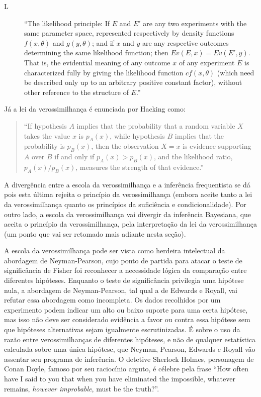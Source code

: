 \begin{description}
\item[L]
``The likelihood principle: If $E$ and $E\prime$ are any two experiments with the same parameter space,
 represented respectively by density functions $f(x, \theta)$ and $g(y, \theta)$; and if $x$ and $y$ are
 any respective outcomes determining the same likelihood function; then $Ev(E, x) = Ev(E\prime, y)$.
 That is, the evidential meaning of any outcome $x$ of any experiment $E$ is characterized fully by giving
 the likelihood function $cf(x, \theta)$ (which need be described only up to an arbitrary positive constant
 factor), without other reference to the structure of $E$.''
\citep{Birnbaum62}
\end{description}

Já a lei da verossimilhança é enunciada por Hacking como:

\begin{quote}
``If hypothesis $A$ implies that the probability that a random variable $X$ takes the value $x$ is $p_A(x)$, while
hypothesis $B$ implies that the probability is $p_B(x)$, then the observation $X=x$ is evidence supporting 
$A$ over $B$ if and only if $p_A(x) > p_B(x)$, and the likelihood ratio, $p_A(x)/p_B(x)$, measures the strength
 of that evidence.''
\citep{Hacking65}
\end{quote}

A divergência entre a escola da verossimilhança e a inferência frequentista se dá pois esta última rejeita o
princípio da verossimilhança (embora aceite tanto a lei da verossimilhança quanto os princípios da suficiência
e condicionalidade). Por outro lado, a escola da verossimilhança vai divergir da inferência Bayesiana, que aceita
o princípio da verossimilhança, pela interpretação da lei da verossimilhança (um  ponto
que vai ser retomado mais adiante nesta seção).

A escola da verossimilhança pode ser vista como herdeira intelectual da abordagem de Neyman-Pearson, cujo ponto de partida
para atacar o teste de significância de Fisher foi reconhecer a
necessidade lógica da comparação entre diferentes hipóteses.
Enquanto o teste de significância privilegia uma hipótese nula, a abordagem de Neyman-Pearson, tal qual a de Edwards e Royall,
vai refutar essa abordagem como incompleta. Os dados recolhidos por um experimento podem indicar um alto ou baixo
suporte para uma certa hipótese, 
mas isso não deve ser considerado evidência a favor ou contra essa hipótese sem
que hipóteses alternativas sejam igualmente escrutinizadas. É sobre o uso da razão entre verossimilhanças de diferentes hipóteses,
e não de qualquer estatística calculada sobre uma única hipótese, que Neyman, Pearson, Edwards e Royall vão assentar seu
programa de inferência. O detetive Sherlock Holmes, personagem de Conan Doyle, famoso por seu raciocínio arguto, é célebre
pela frase ``How often have I said to you that when you have eliminated the impossible, whatever remains, {\em however 
improbable}, must be the truth?''.

